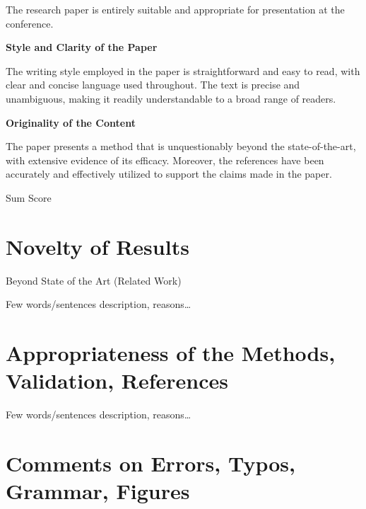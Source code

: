 \documentclass[a4paper,12pt]{article}
\begin{document}
The research paper is entirely suitable and appropriate for presentation at the conference.

\bigskip


\textbf{Style and Clarity of the Paper}

The writing style employed in the paper is straightforward and easy to read, with clear and concise language used throughout. The text is precise and unambiguous, making it readily understandable to a broad range of readers.

\bigskip


\textbf{Originality of the Content}

The paper presents a method that is unquestionably beyond the state-of-the-art, with extensive evidence of its efficacy. Moreover, the references have been accurately and effectively utilized to support the claims made in the paper.

\bigskip


{\Large Sum Score } %


\section{Novelty of Results}

Beyond State of the Art (Related Work)

Few words/sentences description, reasons\dots  %


\section{Appropriateness of the Methods,\\ Validation, References}

Few words/sentences description, reasons\dots  %


\section{Comments on Errors, Typos, Grammar, Figures}
\end{document}

